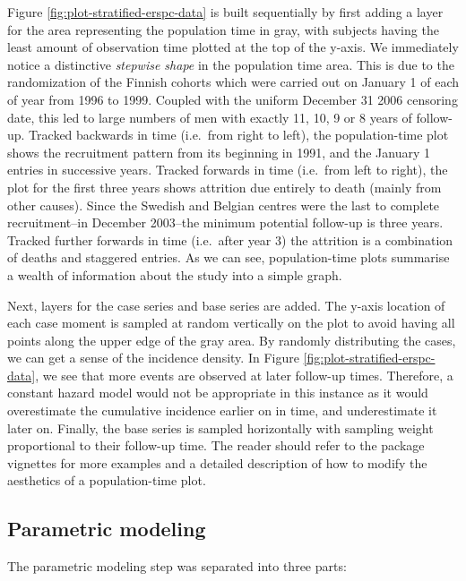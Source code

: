 \documentclass[
]{jss}
\begin{document}
Figure \ref{fig:plot-stratified-erspc-data} is built sequentially by
first adding a layer for the area representing the population time in
gray, with subjects having the least amount of observation time plotted
at the top of the y-axis. We immediately notice a distinctive
\emph{stepwise shape} in the population time area. This is due to the
randomization of the Finnish cohorts which were carried out on January 1
of each of year from 1996 to 1999. Coupled with the uniform December 31
2006 censoring date, this led to large numbers of men with exactly 11,
10, 9 or 8 years of follow-up. Tracked backwards in time (i.e.~from
right to left), the population-time plot shows the recruitment pattern
from its beginning in 1991, and the January 1 entries in successive
years. Tracked forwards in time (i.e.~from left to right), the plot for
the first three years shows attrition due entirely to death (mainly from
other causes). Since the Swedish and Belgian centres were the last to
complete recruitment--in December 2003--the minimum potential follow-up
is three years. Tracked further forwards in time (i.e.~after year 3) the
attrition is a combination of deaths and staggered entries. As we can
see, population-time plots summarise a wealth of information about the
study into a simple graph.

Next, layers for the case series and base series are added. The y-axis
location of each case moment is sampled at random vertically on the plot
to avoid having all points along the upper edge of the gray area. By
randomly distributing the cases, we can get a sense of the incidence
density. In Figure \ref{fig:plot-stratified-erspc-data}, we see that
more events are observed at later follow-up times. Therefore, a constant
hazard model would not be appropriate in this instance as it would
overestimate the cumulative incidence earlier on in time, and
underestimate it later on. Finally, the base series is sampled
horizontally with sampling weight proportional to their follow-up time.
The reader should refer to the package vignettes for more examples and a
detailed description of how to modify the aesthetics of a
population-time plot.

\hypertarget{parametric-modeling}{%
\subsection{Parametric modeling}\label{parametric-modeling}}

The parametric modeling step was separated into three parts:
\end{document}

